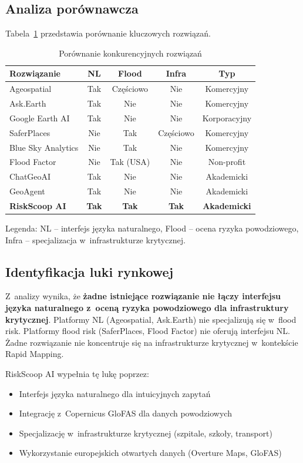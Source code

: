 \subsection{Analiza porównawcza}

Tabela~\ref{tab:competitive-comparison} przedstawia porównanie kluczowych rozwiązań.

\begin{table}[H]
\centering
\caption{Porównanie konkurencyjnych rozwiązań}
\label{tab:competitive-comparison}
\begin{tabular}{|l|c|c|c|c|}
\hline
\textbf{Rozwiązanie} & \textbf{NL} & \textbf{Flood} & \textbf{Infra} & \textbf{Typ} \\
\hline
Ageospatial & Tak & Częściowo & Nie & Komercyjny \\
\hline
Ask.Earth & Tak & Nie & Nie & Komercyjny \\
\hline
Google Earth AI & Tak & Nie & Nie & Korporacyjny \\
\hline
SaferPlaces & Nie & Tak & Częściowo & Komercyjny \\
\hline
Blue Sky Analytics & Nie & Tak & Nie & Komercyjny \\
\hline
Flood Factor & Nie & Tak (USA) & Nie & Non-profit \\
\hline
ChatGeoAI & Tak & Nie & Nie & Akademicki \\
\hline
GeoAgent & Tak & Nie & Nie & Akademicki \\
\hline
\textbf{RiskScoop AI} & \textbf{Tak} & \textbf{Tak} & \textbf{Tak} & \textbf{Akademicki} \\
\hline
\end{tabular}
\end{table}

Legenda: NL -- interfejs języka naturalnego, Flood -- ocena ryzyka powodziowego, Infra -- specjalizacja w~infrastrukturze krytycznej.

\subsection{Identyfikacja luki rynkowej}

Z~analizy wynika, że \textbf{żadne istniejące rozwiązanie nie łączy interfejsu języka naturalnego z~oceną ryzyka powodziowego dla infrastruktury krytycznej}. Platformy NL (Ageospatial, Ask.Earth) nie specjalizują się w~flood risk. Platformy flood risk (SaferPlaces, Flood Factor) nie oferują interfejsu NL. Żadne rozwiązanie nie koncentruje się na infrastrukturze krytycznej w~kontekście Rapid Mapping.

RiskScoop AI wypełnia tę lukę poprzez:
\begin{itemize}
    \item Interfejs języka naturalnego dla intuicyjnych zapytań
    \item Integrację z~Copernicus GloFAS dla danych powodziowych
    \item Specjalizację w~infrastrukturze krytycznej (szpitale, szkoły, transport)
    \item Wykorzystanie europejskich otwartych danych (Overture Maps, GloFAS)
\end{itemize}

